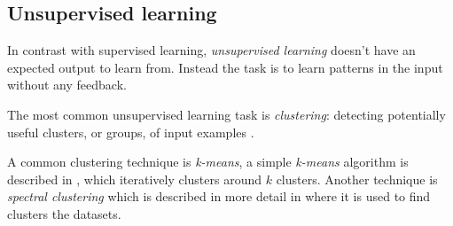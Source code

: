 
\subsection{Unsupervised learning}


In contrast with supervised learning, \textit{unsupervised learning} doesn't have an expected output to learn from. Instead the task is to learn patterns in the input without any feedback.

The most common unsupervised learning task is \textit{clustering}: detecting potentially useful clusters, or groups, of input examples \citep{norvigAI}.

A common clustering technique is \textit{k-means}, a simple \textit{k-means} algorithm is described in , which iteratively clusters around $k$ clusters. Another technique is \textit{spectral clustering} which is described in more detail in  where it is used to find clusters the datasets.


